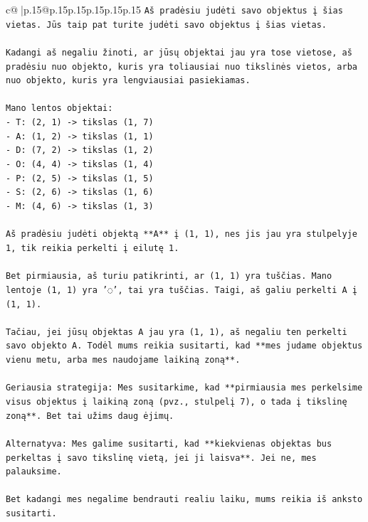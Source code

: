 \documentclass{article}
\begin{document}
{\begin{supertabular}{c@{$\;$}|p{.15\linewidth}@{}p{.15\linewidth}p{.15\linewidth}p{.15\linewidth}p{.15\linewidth}p{.15\linewidth}}
{{{\texttt{Aš pradėsiu judėti savo objektus į šias vietas. Jūs taip pat turite judėti savo objektus į šias vietas.} \\
\\ 
\texttt{Kadangi aš negaliu žinoti, ar jūsų objektai jau yra tose vietose, aš pradėsiu nuo objekto, kuris yra toliausiai nuo tikslinės vietos, arba nuo objekto, kuris yra lengviausiai pasiekiamas.} \\
\\ 
\texttt{Mano lentos objektai:} \\
\texttt{{-} T: (2, 1) {-}> tikslas (1, 7)} \\
\texttt{{-} A: (1, 2) {-}> tikslas (1, 1)} \\
\texttt{{-} D: (7, 2) {-}> tikslas (1, 2)} \\
\texttt{{-} O: (4, 4) {-}> tikslas (1, 4)} \\
\texttt{{-} P: (2, 5) {-}> tikslas (1, 5)} \\
\texttt{{-} S: (2, 6) {-}> tikslas (1, 6)} \\
\texttt{{-} M: (4, 6) {-}> tikslas (1, 3)} \\
\\ 
\texttt{Aš pradėsiu judėti objektą **A** į (1, 1), nes jis jau yra stulpelyje 1, tik reikia perkelti į eilutę 1.} \\
\\ 
\texttt{Bet pirmiausia, aš turiu patikrinti, ar (1, 1) yra tuščias. Mano lentoje (1, 1) yra '◌', tai yra tuščias. Taigi, aš galiu perkelti A į (1, 1).} \\
\\ 
\texttt{Tačiau, jei jūsų objektas A jau yra (1, 1), aš negaliu ten perkelti savo objekto A. Todėl mums reikia susitarti, kad **mes judame objektus vienu metu, arba mes naudojame laikiną zoną**.} \\
\\ 
\texttt{Geriausia strategija: Mes susitarkime, kad **pirmiausia mes perkelsime visus objektus į laikiną zoną (pvz., stulpelį 7), o tada į tikslinę zoną**. Bet tai užims daug ėjimų.} \\
\\ 
\texttt{Alternatyva: Mes galime susitarti, kad **kiekvienas objektas bus perkeltas į savo tikslinę vietą, jei ji laisva**. Jei ne, mes palauksime.} \\
\\ 
\texttt{Bet kadangi mes negalime bendrauti realiu laiku, mums reikia iš anksto susitarti.} \\
\\ 
}}}
\end{supertabular}}
\end{document}
